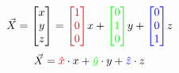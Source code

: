 \documentclass[preview]{standalone}
\begin{document}
$$\vec{X} = \begin{bmatrix}x\\y\\z\end{bmatrix} = \textcolor[HTML]{FF0000}{\begin{bmatrix}1\\0\\0\end{bmatrix}} x + \textcolor[HTML]{00FF00}{\begin{bmatrix}0\\1\\0\end{bmatrix}} y + \textcolor[HTML]{0000FF}{\begin{bmatrix}0\\0\\1\end{bmatrix}} z$$
$$\vec{X} = \textcolor[HTML]{FF0000}{\hat{x}}\cdot x + \textcolor[HTML]{00FF00}{\hat{y}}\cdot y + \textcolor[HTML]{0000FF}{\hat{z}}\cdot z$$
\end{document}
